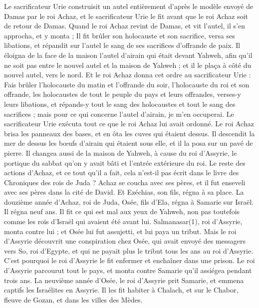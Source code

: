 \begin{multicols}{2}
Le sacrificateur Urie construisit un autel entièrement d’après le modèle envoyé de Damas par le roi Achaz, et le sacrificateur Urie le fit avant que le roi Achaz soit de retour de Damas.
Quand le roi Achaz revint de Damas, et vit l’autel, il s’en approcha, et y monta ;
Il fit brûler son holocauste et son sacrifice, versa ses libations, et répandit sur l’autel le sang de ses sacrifices d’offrande de paix.
Il éloigna de la face de la maison l’autel d’airain qui était devant Yahweh, afin qu’il ne soit pas entre le nouvel autel et la maison de Yahweh ; et il le plaça à côté du nouvel autel, vers le nord.
Et le roi Achaz donna cet ordre au sacrificateur Urie : Fais brûler l’holocauste du matin et l’offrande du soir, l’holocauste du roi et son offrande, les holocaustes de tout le peuple du pays et leurs offrandes, verses-y leurs libations, et répands-y tout le sang des holocaustes et tout le sang des sacrifices ; mais pour ce qui concerne l’autel d’airain, je m’en occuperai.
Le sacrificateur Urie exécuta tout ce que le roi Achaz lui avait ordonné.
Le roi Achaz brisa les panneaux des bases, et en ôta les cuves qui étaient dessus. Il descendit la mer de dessus les bœufs d’airain qui étaient sous elle, et il la posa sur un pavé de pierre.
Il changea aussi de la maison de Yahweh, à cause du roi d’Assyrie, le portique du sabbat qu’on y avait bâti et l’entrée extérieure du roi.
Le reste des actions d’Achaz, et ce tout qu’il a fait, cela n’est-il pas écrit dans le livre des Chroniques des rois de Juda ?
Achaz se coucha avec ses pères, et il fut enseveli avec ses pères dans la cité de David. Et Ezéchias, son fils, régna à sa place.
\VerseOne{}La douzième année d’Achaz, roi de Juda, Osée, fils d’Ela, régna à Samarie sur Israël. Il régna neuf ans.
Il fit ce qui est mal aux yeux de Yahweh, non pas toutefois comme les rois d’Israël qui avaient été avant lui.
Salmanasar(1), roi d’Assyrie, monta contre lui ; et Osée lui fut assujetti, et lui paya un tribut.
Mais le roi d’Assyrie découvrit une conspiration chez Osée, qui avait envoyé des messagers vers So, roi d’Egypte, et qui ne payait plus le tribut tous les ans au roi d’Assyrie. C’est pourquoi le roi d’Assyrie le fit enfermer et enchaîner dans une prison.
Le roi d’Assyrie parcourut tout le pays, et monta contre Samarie qu’il assiégea pendant trois ans.
La neuvième année d’Osée, le roi d’Assyrie prit Samarie, et emmena captifs les Israélites en Assyrie. Il les fit habiter à Chalach, et sur le Chabor, fleuve de Gozan, et dans les villes des Mèdes.

\end{multicols}
